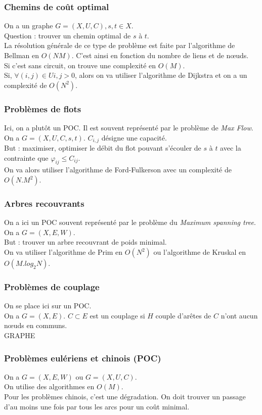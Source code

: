 \subsubsection{Chemins de coût optimal}
On a un graphe $G=(X,U,C), s, t \in X$.\\
Question : trouver un chemin optimal de $s$ à $t$.\\
La résolution générale de ce type de problème est faite par l'algorithme de Bellman en $O(NM)$. C'est ainsi en fonction du nombre de liens et de nœuds.\\
Si c'est sans circuit, on trouve une complexité en $O(M)$.\\
Si, $\forall (i,j) \in U i,j>0$, alors on va utiliser l'algorithme de Dijkstra et on a un complexité de $O(N^2)$.
\subsubsection{Problèmes de flots}
Ici, on a plutôt un POC. Il est souvent représenté par le problème de \textit{Max Flow}.\\
On a $G=(X,U,C,s,t)$. $C_{i,j}$ désigne une capacité.\\
But : maximiser, optimiser le débit du flot pouvant s'écouler de $s$ à $t$ avec la contrainte que $\varphi_{ij} \leqslant C_{ij}$.\\
On va alors utiliser l'algorithme de Ford-Fulkerson avec un complexité de $O(N.M^2)$.
\subsubsection{Arbres recouvrants}
On a ici un POC souvent représenté par le problème du \textit{Maximum spanning tree}.\\
On a $G=(X,E,W)$.\\
But : trouver un arbre recouvrant de poids minimal.\\
On va utiliser l'algorithme de Prim en $O(N^2)$ ou l'algorithme de Kruskal en $O(M.log_2N)$.
\subsubsection{Problèmes de couplage}
On se place ici sur un POC.\\
On a $G=(X,E)$. $C\subset E$ est un couplage si $H$ couple d'arêtes de $C$ n'ont aucun nœuds en communs.\\
GRAPHE\\
\subsubsection{Problèmes eulériens et chinois (POC)}
On a $G=(X,E,W)$ ou $G=(X,U,C)$.\\
On utilise des algorithmes en $O(M)$.\\
Pour les problèmes chinois, c'est une dégradation. On doit trouver un passage d'au moins une fois par tous les arcs pour un coût minimal.
